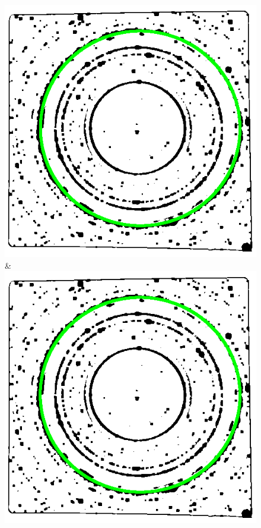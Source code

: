 \documentclass[preprint]{iucr}              %
\begin{document}
\begin{figure}
\begin{tabular}
\includegraphics[width=\linewidth]{Detail/o_Si12_0002_E_2_2.png}&
\includegraphics[width=\linewidth]{Detail/o_Si12_0002_E_2_3.png}
\\

\end{tabular}
\end{figure}
\end{document}
